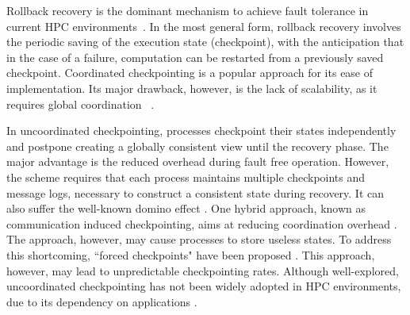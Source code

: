 Rollback recovery is the dominant mechanism to achieve fault
tolerance in current HPC environments~\cite{Elnozahy:02:Survey}. In the most general form, rollback recovery 
involves the periodic saving of the execution state (checkpoint), with the anticipation that
in the case of a failure, computation can be restarted from a previously saved checkpoint. %
Coordinated checkpointing is a popular approach for
its ease of implementation.
Its major drawback, however, is the
lack of scalability, as it requires global coordination
~\cite{elnozahy_dsc_2004}.%


In uncoordinated checkpointing, processes checkpoint their states independently and postpone creating a 
globally consistent view until the recovery phase. The major advantage is the reduced overhead during fault free operation. However, the scheme requires that
each process maintains multiple checkpoints and message logs, necessary to construct a consistent 
state during recovery. It can also suffer the well-known domino effect 
 \cite{randell_domino_effect}. One hybrid approach, known as communication induced 
checkpointing, aims at reducing coordination overhead \cite{alvisi_ftc_1999}. The approach, however, may 
cause processes to store useless states. To address this 
shortcoming, ``forced checkpoints" have been proposed \cite{helary_rds_1997}. This approach, however,  may lead to unpredictable
checkpointing rates. Although well-explored, uncoordinated checkpointing has not been widely adopted
in HPC environments, due to its dependency on applications \cite{guermouche_2011_ipdps}.



